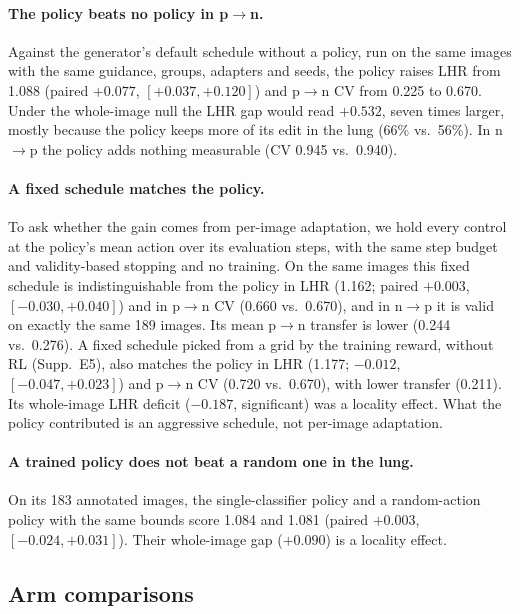 \paragraph{The policy beats no policy in p$\to$n.} Against the generator's default schedule without a policy, run on the same images with the same guidance, groups, adapters and seeds, the policy raises LHR from 1.088 (paired $+0.077$, $[+0.037, +0.120]$) and p$\to$n CV from 0.225 to 0.670. Under the whole-image null the LHR gap would read $+0.532$, seven times larger, mostly because the policy keeps more of its edit in the lung (66\% vs.\ 56\%). In n$\to$p the policy adds nothing measurable (CV 0.945 vs.\ 0.940).

\paragraph{A fixed schedule matches the policy.} To ask whether the gain comes from per-image adaptation, we hold every control at the policy's mean action over its evaluation steps, with the same step budget and validity-based stopping and no training. On the same images this fixed schedule is indistinguishable from the policy in LHR (1.162; paired $+0.003$, $[-0.030, +0.040]$) and in p$\to$n CV (0.660 vs.\ 0.670), and in n$\to$p it is valid on exactly the same 189 images. Its mean p$\to$n transfer is lower (0.244 vs.\ 0.276). A fixed schedule picked from a grid by the training reward, without RL (Supp.~E5), also matches the policy in LHR (1.177; $-0.012$, $[-0.047, +0.023]$) and p$\to$n CV (0.720 vs.\ 0.670), with lower transfer (0.211). Its whole-image LHR deficit ($-0.187$, significant) was a locality effect. What the policy contributed is an aggressive schedule, not per-image adaptation.

\paragraph{A trained policy does not beat a random one in the lung.} On its 183 annotated images, the single-classifier policy and a random-action policy with the same bounds score 1.084 and 1.081 (paired $+0.003$, $[-0.024, +0.031]$). Their whole-image gap ($+0.090$) is a locality effect.

\subsection{Arm comparisons}
\label{sec:five-arms}


